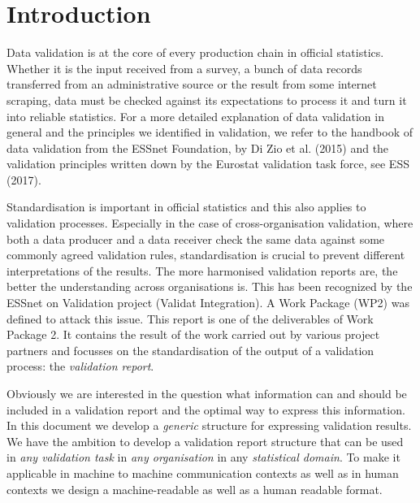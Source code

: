 \section{Introduction}
\label{sect:introduction}

Data validation is at the core of every production chain in official
statistics.  Whether it is the input received from a survey, a bunch of data
records transferred from an administrative source or the result from some
internet scraping, data must be checked against its expectations to process it
and turn it into reliable statistics.  For a more detailed explanation of data
validation in general and the principles we identified in validation, we refer
to the handbook of data validation from the ESSnet Foundation, by Di Zio et al.
(2015) and the validation principles written down by the Eurostat validation
task force, see ESS (2017).

Standardisation is important in official statistics and this also applies to
validation processes.  Especially in the case of cross-organisation validation,
where both a data producer and a data receiver check the same data against some
commonly agreed validation rules, standardisation is crucial to prevent
different interpretations of the results.  The more harmonised validation
reports are, the better the understanding across organisations is.  This has
been recognized by the ESSnet on Validation project (Validat Integration).  A
Work Package (WP2) was defined to attack this issue.  This report is one of the
deliverables of Work Package 2.  It contains the result of the work carried out
by various project partners and focusses on the standardisation of the output
of a validation process: the \emph{validation report}.

Obviously we are interested in the question what information can and should be
included in a validation report and the optimal way to express this
information.  In this document we develop a \emph{generic} structure for
expressing validation results.  We have the ambition to develop a validation
report structure that can be used in \emph{any validation task} in \emph{any
organisation} in any \emph{statistical domain}.  To make it applicable in
machine to machine communication contexts as well as in human contexts we
design a machine-readable as well as a human readable format.

